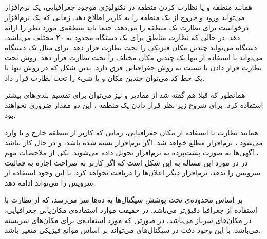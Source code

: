\documentclass[oneside]{report}
\begin{document}
\subsection{{\normalsize {}}}
همانند 
{\normalsize {}} 
منطقه و یا نظارت کردن منطقه در تکنولوژی موجود جغرافیایی، یک نرم‌افزار می‌تواند ورود و خروج از یک منطقه را به کاربر اطلاع دهد. زمانی که یک نرم‌افزار درخواست برای نظارت یک منطقه را می‌دهد،  حتما باید 
{\normalsize {}}
منطقه‌ی مورد نظر را ارائه دهد. در حالی که نظارت مناطق برای یک دستگاه محدود به ۲۰ 
{\normalsize {}}
مختلف می‌باشد،  دستگاه می‌تواند چندین مکان فیزیکی را تحت نظارت قرار دهد. برای مثال یک دستگاه می‌تواند با استفاده از تنها یک 
{\normalsize {}}
چندین مکان مختلف را تحت نظارت قرار دهد. روش تحت نظارت قرار دادن با 
{\normalsize {}}
نسبت به روش جغرافیایی فرق دارد.  بدین شکل که در روش 
{\normalsize {}}
تنها با یک خط کد می‌توان چندین مکان و یا شیء را تحت نظارت قرار داد. 

همانطور که قبلا هم گفته شد از مقادیر 
{\normalsize {}}
 و 
{\normalsize {}}
نیز می‌توان برای تقسیم بندی‌های بیشتر استفاده کرد. برای شروع زیر نظر قرار دادن یک منطقه ، این دو مقدار ضروری نخواهند بود. 

همانند  نظارت با استفاده از مکان جغرافیایی، زمانی که کاربر از منطقه‌ خارج و یا وارد می‌شود ، نرم‌افزار مطلع خواهد شد. اگر نرم‌افزار بسته شده باشد، و در حال کار نباشد ، آگهی‌ها 
		       	به صورت پشت‌پرده 
		       	به نرم‌افزار تحویل داده می‌شوند.  یکی از ملاحضات مهم در 
{\normalsize {}}
در مورد این مسأله به این شکل است که اگر کاربر به صراحت اجازه به فعالیت سرویس 
{\normalsize {}}
را ندهد، نرم‌افزار دیگر اعلان‌ها را دریافت نخواهد کرد.  با این وجود استفاده از سرویس
{\normalsize {}}
را می‌تواند ادامه دهد.

 بر اساس 
 {\normalsize {}}
 محدوده‌ی تحت پوشش سیگنال‌ها به ده‌ها متر می‌رسد، که از نظارت با استفاده از جغرافیا دقیق‌تر می‌باشد.
 در حقیقت موارد استفاده‌ی مکان‌یابی جغرافیایی،  در مکان‌های سرباز می‌باشد، در صورتی که مورد استفاده‌ی 
 {\normalsize {}}
 برای مکان‌های سربسته می‌باشد. با این وجود دقت در سیگنال‌های 
 {\normalsize {}}
 می‌تواند بر اساس موانع فیزیکی متغیر باشد. 
  		       	
\end{document}
